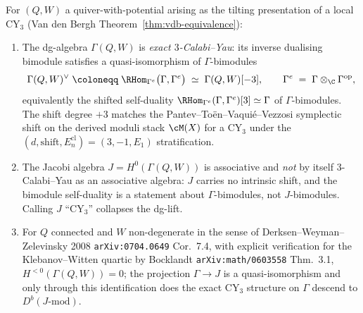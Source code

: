 \begin{theorem}
\label{thm:cy3-on-gamma-not-j}
For $(Q, W)$ a quiver-with-potential arising as the tilting presentation of a local CY$_3$ (Van den Bergh Theorem~\ref{thm:vdb-equivalence}):
\begin{enumerate}
 \item[(a)] The dg-algebra $\Gamma(Q, W)$ is \emph{exact $3$-Calabi--Yau}: its inverse dualising bimodule satisfies a quasi-isomorphism of $\Gamma$-bimodules
 \[
 \Gamma(Q, W)^{\vee} \;\coloneqq\; \RHom_{\Gamma^{e}}\bigl(\Gamma, \Gamma^{e}\bigr) \;\simeq\; \Gamma(Q, W)[-3],
 \qquad \Gamma^{e} \;=\; \Gamma \otimes_{\C} \Gamma^{\mathrm{op}},
 \]
 equivalently the shifted self-duality $\RHom_{\Gamma^{e}}(\Gamma, \Gamma^{e})[3] \simeq \Gamma$ of $\Gamma$-bimodules. The shift degree $+3$ matches the Pantev--To\"en--Vaqui\'e--Vezzosi symplectic shift on the derived moduli stack $\cM(X)$ for a CY$_3$ under the $(d, \mathrm{shift}, E_n^{\mathrm{cl}}) = (3, -1, E_1)$ stratification.
 \item[(b)] The Jacobi algebra $J = H^{0}(\Gamma(Q, W))$ is associative and \emph{not} by itself 3-Calabi--Yau as an associative algebra: $J$ carries no intrinsic shift, and the bimodule self-duality is a statement about $\Gamma$-bimodules, not $J$-bimodules. Calling $J$ ``CY$_3$'' collapses the dg-lift.
 \item[(c)] For $Q$ connected and $W$ non-degenerate in the sense of Derksen--Weyman--Zelevinsky 2008 \texttt{arXiv:0704.0649} Cor.~7.4, with explicit verification for the Klebanov--Witten quartic by Bocklandt \texttt{arXiv:math/0603558} Thm.~3.1, $H^{<0}(\Gamma(Q, W)) = 0$; the projection $\Gamma \to J$ is a quasi-isomorphism and only through this identification does the exact CY$_3$ structure on $\Gamma$ descend to $D^{b}(J\text{-}\mathrm{mod})$.
\end{enumerate}
\end{theorem}

